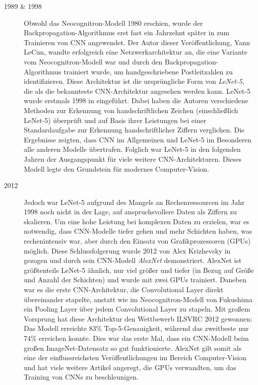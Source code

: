 \begin{description}
	\item[1989 \& 1998]
	
	Obwohl das Neocognitron-Modell 1980 erschien, wurde der Backpropagation-Algorithmus erst fast ein Jahrzehnt später in \cite{yannlecun1989} zum Trainieren von CNN angewendet. Der Autor dieser Veröffentlichung, Yann LeCun, wandte erfolgreich eine Netzwerkarchitektur an, die eine Variante vom Neocognitron-Modell war und durch den Backpropagation-Algorithmus trainiert wurde, um handgeschriebene Postleitzahlen zu identifizieren. Diese Architektur ist die ursprüngliche Form von \emph{LeNet-5}, die als die bekannteste CNN-Architektur angesehen werden kann. LeNet-5 wurde erstmals 1998 in \cite{yannlecun1998} eingeführt. Dabei haben die Autoren verschiedene Methoden zur Erkennung von handschriftlichen Zeichen (einschließlich LeNet-5) überprüft und auf Basis ihrer Leistungen bei einer Standardaufgabe zur Erkennung handschriftlicher Ziffern verglichen. Die Ergebnisse zeigten, dass CNN im Allgemeinen und LeNet-5 im Besonderen alle anderen Modelle übertrafen. Folglich war LeNet-5 in den folgenden Jahren der Ausgangspunkt für viele weitere CNN-Architekturen. Dieses Modell legte den Grundstein für modernes Computer-Vision.
	
	\item[2012]
	
	Jedoch war LeNet-5 aufgrund des Mangels an Rechenressourcen im Jahr 1998 noch nicht in der Lage, auf anspruchsvollere Daten als Ziffern zu skalieren. Um eine hohe Leistung bei komplexen Daten zu erzielen, war es notwendig, dass CNN-Modelle tiefer gehen und mehr Schichten haben, was rechenintensiv war, aber durch den Einsatz von Grafikprozessoren (GPUs) möglich. Diese Schlussfolgerung wurde 2012 von Alex Krizhevsky in \cite{10.1145/3065386} gezogen und durch sein CNN-Modell \emph{AlexNet} demonstriert. AlexNet ist größtenteils LeNet-5 ähnlich, nur viel größer und tiefer (in Bezug auf Größe und Anzahl der Schichten) und wurde mit zwei GPUs trainiert. Daneben war es die erste CNN-Architektur, die Convolutional Layer direkt übereinander stapelte, anstatt wie im Neocognitron-Modell von Fukushima ein Pooling Layer über jedem Convolutional Layer zu stapeln. Mit großem Vorsprung hat diese Architektur den Wettbewerb ILSVRC 2012 gewonnen: Das Modell erreichte 83\% Top-5-Genauigkeit, während das zweitbeste nur 74\% erreichen konnte. Dies war das erste Mal, dass ein CNN-Modell beim großen ImageNet-Datensatz so gut funktionierte. AlexNet gilt somit als eine der einflussreichsten Veröffentlichungen im Bereich Computer-Vision und hat viele weitere Artikel angeregt, die GPUs verwandten, um das Training von CNNs zu beschleunigen.
	
\end{description}

